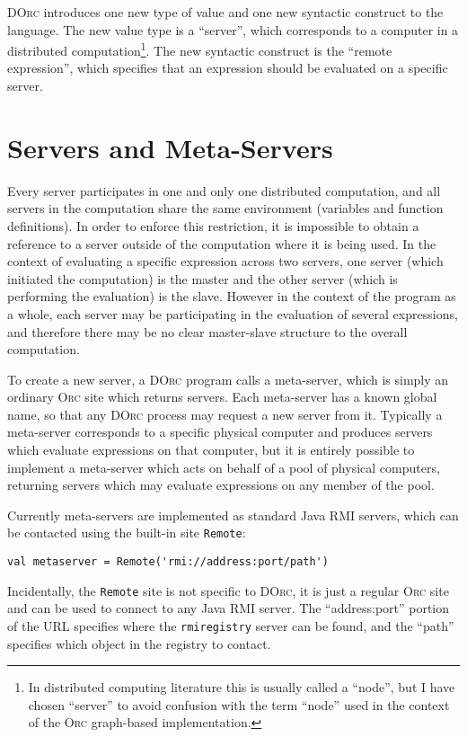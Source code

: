 \documentclass[10pt,letterpaper]{article}
\begin{document}
\textsc{DOrc} introduces one new type of value and one new syntactic construct
to the language. The new value type is a ``server'', which corresponds to a
computer in a distributed computation\footnote{In distributed computing
literature this is usually called a ``node'', but I have chosen ``server'' to
avoid confusion with the term ``node'' used in the context of the \textsc{Orc}
graph-based implementation.}. The new syntactic construct is the ``remote
expression'', which specifies that an expression should be evaluated on a
specific server.

\section{Servers and Meta-Servers}

Every server participates in one and only one distributed computation, and all
servers in the computation share the same environment (variables and function
definitions). In order to enforce this restriction, it is impossible to obtain
a reference to a server outside of the computation where it is being used. In
the context of evaluating a specific expression across two servers, one server
(which initiated the computation) is the master and the other server (which is
performing the evaluation) is the slave. However in the context of the program
as a whole, each server may be participating in the evaluation of several
expressions, and therefore there may be no clear master-slave structure to the
overall computation.

To create a new server, a \textsc{DOrc} program calls a meta-server, which is
simply an ordinary \textsc{Orc} site which returns servers. Each meta-server
has a known global name, so that any \textsc{DOrc} process may request a new
server from it. Typically a meta-server corresponds to a specific physical
computer and produces servers which evaluate expressions on that computer, but
it is entirely possible to implement a meta-server which acts on behalf of a
pool of physical computers, returning servers which may evaluate expressions on
any member of the pool.

Currently meta-servers are implemented as standard Java RMI servers, which can
be contacted using the built-in site \texttt{Remote}:
\begin{verbatim}
val metaserver = Remote('rmi://address:port/path')
\end{verbatim}
Incidentally, the \texttt{Remote} site is not specific to \textsc{DOrc}, it is
just a regular \textsc{Orc} site and can be used to connect to any Java RMI
server. The ``address:port'' portion of the URL specifies where the
\texttt{rmiregistry} server can be found, and the ``path'' specifies which
object in the registry to contact.
\end{document}
